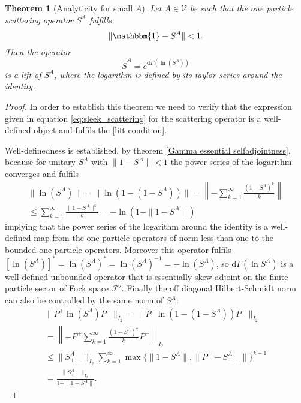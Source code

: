 \documentclass[b5paper,draft,openbib,12pt]{memoir}
\newtheorem{Thm}[Def]{Theorem}
\newcommand{\id}{\mathbbm{1}}
\begin{document}
\begin{Thm}[Analyticity for small \(A\)]\label{sleek_second_quantised_scattering_operator}
Let \(A\in\mathcal{V}\) be such that the one 
particle scattering operator \(S^A\) fulfills
\begin{equation}
\|\id-S^A\|<1.
\end{equation}
Then the operator 
\begin{equation}\label{eq:sleek_scattering}
\tilde{S}^A=  e^{\mathrm{d}\Gamma(\ln (S^A))}
\end{equation}
is a lift of \(S^A\), where the logarithm is defined by its 
taylor series around the identity.
\end{Thm}
\begin{proof}
In order to establish this theorem we need to verify that the 
expression given in equation \eqref{eq:sleek_scattering} for the scattering 
operator
 is a well-defined object
and fulfils the \eqref{lift condition}.

Well-definedness is established, by theorem 
\ref{Gamma essential selfadjointness}, because for unitary \(S^A\)
with \(\|1-S^A\|<1\) the power series of the logarithm converges 
and fulfils
\begin{align}
\|\ln(S^A)\|=\|\ln (1-(1-S^A))\|= \left\| -\sum_{k=1}^\infty \frac{(1-S^A)^k}{k} \right\|\\
 \le  \sum_{k=1}^\infty \frac{\|1-S^A\|^k}{k}=-\ln(1-\|1-S^A\|)
\end{align}
implying that the power series of the logarithm around the 
identity is a well-defined map from the one particle 
operators of norm less than
one to the bounded one particle operators. Moreover this 
operator fulfils \([\ln (S^A)]^*=\ln (S^A)^*= \ln 
(S^A)^{-1}=-\ln (S^A)\), so 
\(\mathrm{d}\Gamma(\ln S^A)\) is a well-defined unbounded 
operator that is essentially skew adjoint on the finite 
particle sector of Fock space \(\mathcal{F}'\). Finally the 
off diagonal Hilbert-Schmidt norm can also be controlled by 
the same norm of \(S^A\):
\begin{align}
  \|P^+\ln(S^A)P^-\|_{I_2}=\|P^+\ln (1-(1-S^A))P^-\|_{I_2}\\
  = \left\| - P^+\sum_{k=1}^\infty \frac{(1-S^A)^k}{k} P^-\right\|_{I_2}\\
   \le  \|S^A_{+-}\|_{I_2}\sum_{k=1}^\infty \max\{\|1-S^A\|,\|P^--S^A_{--}\|\}^{k-1}\\
   =\frac{\|S^A_{+-}\|_{I_2}}{1-\|1-S^A\|}.
\end{align}



\end{proof}
\end{document}
